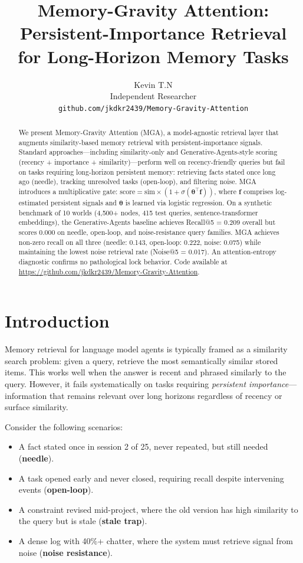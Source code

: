 \documentclass{article}
\title{Memory-Gravity Attention: Persistent-Importance Retrieval\\for Long-Horizon Memory Tasks}
\author{
  Kevin T.N \\
  Independent Researcher \\
  \texttt{github.com/jkdkr2439/Memory-Gravity-Attention}
}
\begin{document}
\maketitle

\begin{abstract}
We present Memory-Gravity Attention (MGA), a model-agnostic retrieval layer that augments similarity-based memory retrieval with persistent-importance signals. Standard approaches---including similarity-only and Generative-Agents-style scoring (recency + importance + similarity)---perform well on recency-friendly queries but fail on tasks requiring long-horizon persistent memory: retrieving facts stated once long ago (needle), tracking unresolved tasks (open-loop), and filtering noise. MGA introduces a multiplicative gate: $\text{score} = \text{sim} \times (1 + \sigma(\boldsymbol{\theta}^\top \mathbf{f}))$, where $\mathbf{f}$ comprises log-estimated persistent signals and $\boldsymbol{\theta}$ is learned via logistic regression. On a synthetic benchmark of 10 worlds (4{,}500+ nodes, 415 test queries, sentence-transformer embeddings), the Generative-Agents baseline achieves Recall@5 = 0.209 overall but scores 0.000 on needle, open-loop, and noise-resistance query families. MGA achieves non-zero recall on all three (needle: 0.143, open-loop: 0.222, noise: 0.075) while maintaining the lowest noise retrieval rate (Noise@5 = 0.017). An attention-entropy diagnostic confirms no pathological lock behavior. Code available at \url{https://github.com/jkdkr2439/Memory-Gravity-Attention}.
\end{abstract}

\section{Introduction}

Memory retrieval for language model agents is typically framed as a similarity search problem: given a query, retrieve the most semantically similar stored items. This works well when the answer is recent and phrased similarly to the query. However, it fails systematically on tasks requiring \emph{persistent importance}---information that remains relevant over long horizons regardless of recency or surface similarity.

Consider the following scenarios:
\begin{itemize}[leftmargin=2em,itemsep=2pt]
\item A fact stated once in session 2 of 25, never repeated, but still needed (\textbf{needle}).
\item A task opened early and never closed, requiring recall despite intervening events (\textbf{open-loop}).
\item A constraint revised mid-project, where the old version has high similarity to the query but is stale (\textbf{stale trap}).
\item A dense log with 40\%+ chatter, where the system must retrieve signal from noise (\textbf{noise resistance}).
\end{itemize}
\end{document}

